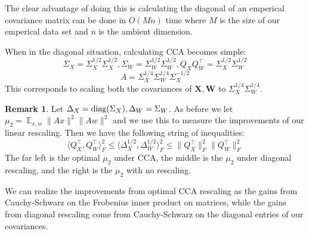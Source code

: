 \documentclass{article}
\theoremstyle{definition}
\newtheorem{remark}[theorem]{Remark}
\theoremstyle{plain}
\DeclareMathOperator{\E}{\mathbb{E}}
\DeclarePairedDelimiter\parentheses{\lparen}{\rparen}
\newcommand{\diag}[1]{\operatorname{diag} \parentheses*{#1}}
\begin{document}
The clear advantage of doing this is calculating the diagonal of an emperical covariance matrix can be done in $O(Mn)$ time where $M$ is the size of our emperical data set and $n$ is the ambient dimension. 

When in the diagonal situation, calculating CCA becomes simple: 
\[\Sigma_X = \Sigma_X^{1/2} \Sigma_X^{1/2}, \Sigma_W = \Sigma_W^{1/2} \Sigma_W^{1/2}, Q_X Q_W^\top = \Sigma_X^{1/2}\Sigma_W^{1/2}\]
\[A = \Sigma_X^{1/4}\Sigma_W^{1/4}\Sigma_X^{-1/2}\]
This corresponds to scaling both the covariances of $\mathbf{X},\mathbf{W}$ to $\Sigma_X^{1/4}\Sigma_W^{1/4}$.
\begin{remark}
Let $\Delta_X = \diag{\Sigma_X}, \Delta_W = {\Sigma_W}$. As before we let $\mu_2 = \E_{x,w} \|A x\|^2 \|A w\|^2$ and we use this to measure the improvements of our linear rescaling. Then we have the following string of inequalities:
\[ \langle Q_X^{\top}, Q_W^{\top} \rangle_F^2 \leq \langle \Delta_X^{1/2}, \Delta_W^{1/2}\rangle_F^2 \leq \|Q_X^\top\|_F^2 \|Q_W^\top\|_F^2 \]
The far left is the optimal $\mu_2$ under CCA, the middle is the $\mu_2$ under diagonal rescaling, and the right is the $\mu_2$ with no rescaling. 

We can realize the improvements from optimal CCA rescaling as the gains from Cauchy-Schwarz on the Frobenius inner product on matrices, while the gains from diagonal rescaling come from Cauchy-Schwarz on the diagonal entries of our covariances. 
\end{remark}
\end{document}
